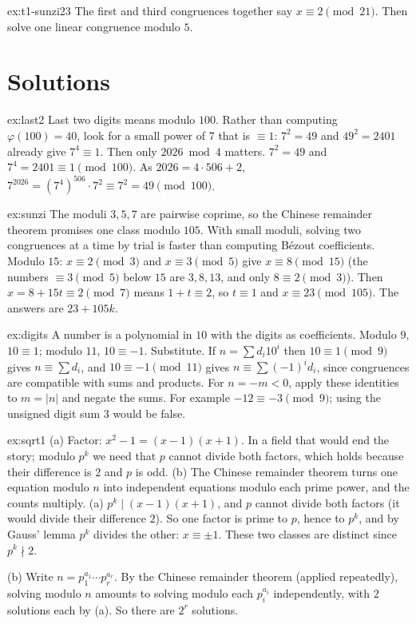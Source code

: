 \begin{hint}{ex:t1-sunzi23}
The first and third congruences together say $x\equiv 2\pmod{21}$. Then solve one linear congruence modulo $5$.
\end{hint}

\section{Solutions}

\begin{solution}{ex:last2}
\idea Last two digits means modulo $100$. Rather than computing $\varphi(100)=40$, look for a small power of $7$ that is $\equiv1$: $7^2=49$ and $49^2=2401$ already give $7^4\equiv1$. Then only $2026\bmod4$ matters.
\writeup $7^2=49$ and $7^4=2401\equiv1\pmod{100}$. As $2026=4\cdot506+2$, $7^{2026}=(7^4)^{506}\cdot7^2\equiv7^2=49\pmod{100}$.
\end{solution}

\begin{solution}{ex:sunzi}
\idea The moduli $3,5,7$ are pairwise coprime, so the Chinese remainder theorem promises one class modulo $105$. With small moduli, solving two congruences at a time by trial is faster than computing B\'ezout coefficients.
\writeup Modulo $15$: $x\equiv2\pmod3$ and $x\equiv3\pmod5$ give $x\equiv8\pmod{15}$ (the numbers $\equiv3\pmod5$ below $15$ are $3,8,13$, and only $8\equiv2\pmod3$). Then $x=8+15t\equiv2\pmod7$ means $1+t\equiv2$, so $t\equiv1$ and $x\equiv23\pmod{105}$. The answers are $23+105k$.
\end{solution}

\begin{solution}{ex:digits}
\idea A number is a polynomial in $10$ with the digits as coefficients. Modulo $9$, $10\equiv1$; modulo $11$, $10\equiv-1$. Substitute.
\writeup If $n=\sum d_i10^i$ then $10\equiv1\pmod9$ gives $n\equiv\sum d_i$, and $10\equiv-1\pmod{11}$ gives $n\equiv\sum(-1)^id_i$, since congruences are compatible with sums and products. For $n=-m<0$, apply these identities to $m=|n|$ and negate the sums. For example $-12\equiv-3\pmod9$; using the unsigned digit sum $3$ would be false.
\end{solution}

\begin{solution}{ex:sqrt1}
\idea (a) Factor: $x^2-1=(x-1)(x+1)$. In a field that would end the story; modulo $p^k$ we need that $p$ cannot divide both factors, which holds because their difference is $2$ and $p$ is odd. (b) The Chinese remainder theorem turns one equation modulo $n$ into independent equations modulo each prime power, and the counts multiply.
\writeup (a) $p^k\mid(x-1)(x+1)$, and $p$ cannot divide both factors (it would divide their difference $2$). So one factor is prime to $p$, hence to $p^k$, and by Gauss' lemma $p^k$ divides the other: $x\equiv\pm1$. These two classes are distinct since $p^k\nmid2$.

(b) Write $n=p_1^{a_1}\cdots p_r^{a_r}$. By the Chinese remainder theorem (applied repeatedly), solving modulo $n$ amounts to solving modulo each $p_i^{a_i}$ independently, with $2$ solutions each by (a). So there are $2^r$ solutions.
\end{solution}


